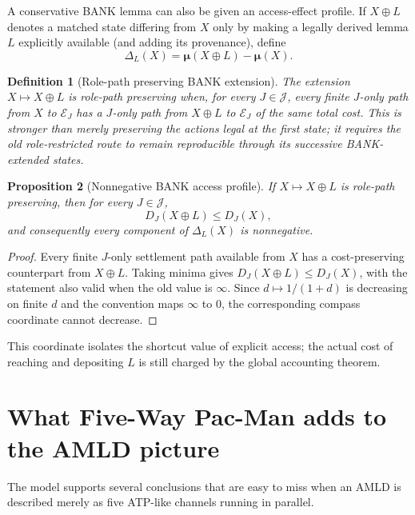 \documentclass[11pt]{article}
\newtheorem{definition}{Definition}[section]
\newtheorem{proposition}[definition]{Proposition}
\theoremstyle{remark}
\newcommand{\Roles}{\mathcal J}
\newcommand{\Exit}{\mathcal E}
\begin{document}
A conservative BANK lemma can also be given an access-effect profile. If $X\oplus L$ denotes a matched state differing from $X$ only by making a legally derived lemma $L$ explicitly available (and adding its provenance), define
\[
\Delta_L(X)
=
\boldsymbol{\mu}(X\oplus L)-\boldsymbol{\mu}(X).
\]

\begin{definition}[Role-path preserving BANK extension]
The extension $X\mapsto X\oplus L$ is role-path preserving when, for every $J\in\Roles$, every finite $J$-only path from $X$ to $\Exit_J$ has a $J$-only path from $X\oplus L$ to $\Exit_J$ of the same total cost. This is stronger than merely preserving the actions legal at the first state; it requires the old role-restricted route to remain reproducible through its successive BANK-extended states.
\end{definition}

\begin{proposition}[Nonnegative BANK access profile]
If $X\mapsto X\oplus L$ is role-path preserving, then for every $J\in\Roles$,
\[
D_J(X\oplus L)\le D_J(X),
\]
and consequently every component of $\Delta_L(X)$ is nonnegative.
\end{proposition}
\begin{proof}
Every finite $J$-only settlement path available from $X$ has a cost-preserving counterpart from $X\oplus L$. Taking minima gives $D_J(X\oplus L)\le D_J(X)$, with the statement also valid when the old value is $\infty$. Since $d\mapsto 1/(1+d)$ is decreasing on finite $d$ and the convention maps $\infty$ to $0$, the corresponding compass coordinate cannot decrease.
\end{proof}

This coordinate isolates the shortcut value of explicit access; the actual cost of reaching and depositing $L$ is still charged by the global accounting theorem.

\section{What Five-Way Pac-Man adds to the AMLD picture}

The model supports several conclusions that are easy to miss when an AMLD is described merely as five ATP-like channels running in parallel.
\end{document}
